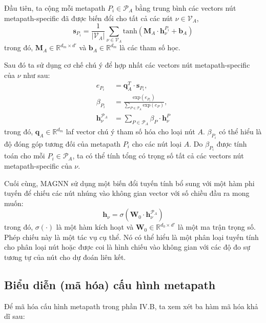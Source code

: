 Đầu tiên, ta cộng mỗi metapath $P_i \in \pmb{\mathcal{P}}_A$ bằng trung bình các vectors nút metapath-specific đã được biến đổi cho tất cả các nút $\nu \in \pmb{\mathcal{V}}_A$,
\begin{equation}
  \mathbf{s}_{P_i} = \frac{1}{|\pmb{\mathcal{V}}_A|} \sum_{\nu \in \pmb{\mathcal{V}}_A} \text{tanh} \left( \mathbf{M}_A \cdot \mathbf{h}^{P_i}_{\nu} + \mathbf{b}_A \right)
\end{equation}
trong đó, $\mathbf{M}_A \in \mathbb{R}^{d_m \times d'}$ và $\mathbf{b}_A \in \mathbb{R}^{d_m}$ là các tham số học.

Sau đó ta sử dụng cơ chế chú ý để  hợp nhất các vectors nút metapath-specific của $\nu$ như sau:
\begin{equation}
  \begin{split}
    e_{P_i} &= \mathbf{q}^T_A \cdot \mathbf{s}_{P_i}, \\
    \beta _{P_i} &= \frac{\text{exp}(e_{P_i})}{\sum_{P \in \pmb{\mathcal{P}}_A} \text{exp}(e_{P})}, \\
    \mathbf{h}^{\pmb{\mathcal{P}}_A}_{\nu} &= \sum_{P \in \pmb{\mathcal{P}}_A} \beta _{P} \cdot \mathbf{h}^P_{\nu}
  \end{split}
\end{equation}
trong đó, $\mathbf{q}_A \in \mathbb{R}^{d_m}$ laf vector chú ý tham số hóa cho loại nút $A$. $\beta _{P_i}$ có thể hiểu là độ đóng góp tương đối của metapath $P_i$ cho các nút loại $A$. Do $\beta _{P_i}$ được tính toán cho mỗi $P_i \in \pmb{\mathcal{P}}_A$, ta có thể tính tổng có trọng số tất cả các vectors nút metapath-specific của $\nu$.

Cuối cùng, MAGNN sử dụng một biến đổi tuyến tính bổ sung với một hàm phi tuyến để chiếu các nút nhúng vào không gian vector với số chiều đầu ra mong muốn:
\begin{equation}
  \mathbf{h}_{\nu} = \sigma \left( \mathbf{W}_0 \cdot \mathbf{h}^{\pmb{\mathcal{P}}_A}_{\nu} \right)
\end{equation}
trong đó, $\sigma (\cdot)$ là một hàm kích hoạt và $\mathbf{W}_0 \in \mathbb{R}^{d_0 \times d'}$ là một ma trận trọng số. Phép chiếu này là một tác vụ cụ thể. Nó có thể hiểu là một phân loại tuyến tính cho phân loại nút hoặc được coi là hình chiếu vào không gian với các độ đo sự tương tự của nút cho dự đoán liên kết. 

\subsection{Biểu diễn (mã hóa) cấu hình metapath}
Để mã hóa cấu hình metapath trong phần IV.B, ta xem xét ba hàm mã hóa khả dĩ sau: 

